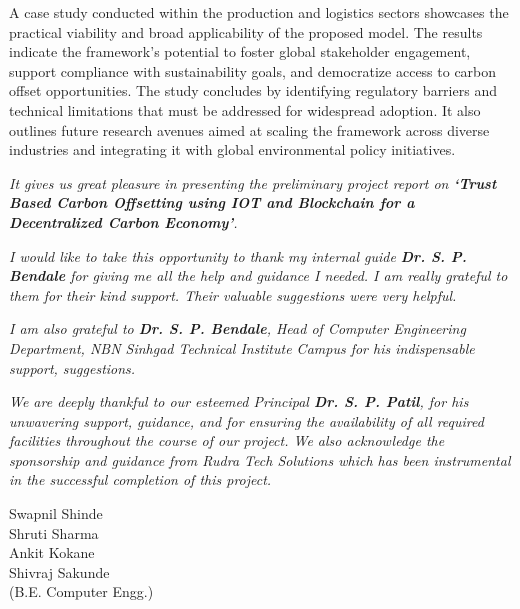 \documentclass[oneside,a4paper,12pt]{book}
\begin{document}
A case study conducted within the production and logistics sectors showcases the practical viability and broad applicability of the proposed model. The results indicate the framework's potential to foster global stakeholder engagement, support compliance with sustainability goals, and democratize access to carbon offset opportunities. The study concludes by identifying regulatory barriers and technical limitations that must be addressed for widespread adoption. It also outlines future research avenues aimed at scaling the framework across diverse industries and integrating it with global environmental policy initiatives.

{   \setlength{\parindent}{11mm} }
{ \setlength{\parindent}{0mm} }

\textit{It gives us great pleasure in presenting the preliminary project report 
on {\bfseries \fontsize{12}{12} \selectfont `Trust Based Carbon Offsetting using IOT and Blockchain for a Decentralized Carbon Economy'}.}
\vspace*{1.5\baselineskip}

 \textit{I would like to take this opportunity to thank my internal guide
 \textbf{Dr. S. P. Bendale} for giving me all the help and guidance I needed. I am
 really grateful to them for their kind support. Their valuable suggestions were very helpful.} \vspace*{1.5\baselineskip}

 \textit{I am also grateful to \textbf{Dr. S. P. Bendale}, Head of Computer
 Engineering Department, NBN Sinhgad Technical Institute Campus for his indispensable
 support, suggestions.}
\vspace*{1.5\baselineskip}

\textit{We are deeply thankful to our esteemed Principal \textbf{Dr. S. P. Patil}, for his unwavering support, guidance, and for ensuring the availability of all required facilities throughout the course of our project. We also acknowledge the sponsorship and guidance from Rudra Tech Solutions which has been instrumental in the successful completion of this project.}
\vspace*{3\baselineskip} 

\begin{flushright}
Swapnil Shinde\\
Shruti Sharma\\
Ankit Kokane\\
Shivraj Sakunde\\
(B.E. Computer Engg.)
\end{flushright}
\end{document}
